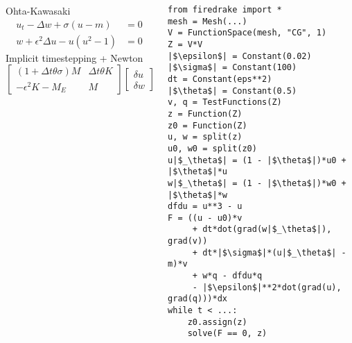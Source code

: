 \documentclass[presentation]{beamer}
\begin{document}
\begin{frame}[fragile]
  \begin{columns}
    \begin{column}{0.5\textwidth}
      \begin{block}{Ohta-Kawasaki}
        \small
        \begin{align*}
          u_t - \Delta w + \sigma(u - m) &= 0\\
          w + \epsilon^2 \Delta u - u(u^2 - 1) &= 0
        \end{align*}
        Implicit timestepping + Newton
        \begin{equation*}
          \begin{bmatrix}
            (1 + \Delta t \theta \sigma)M  & \Delta t\theta K \\
            -\epsilon^2 K - M_E & M
          \end{bmatrix}
          \begin{bmatrix}
            \delta u \\
            \delta w
          \end{bmatrix} =
          \begin{bmatrix}
            f_1 \\
            f_2
          \end{bmatrix}
        \end{equation*}
      \end{block}
    \end{column}
    \begin{column}{0.5\textwidth}
\begin{verbatim}
from firedrake import *
mesh = Mesh(...)
V = FunctionSpace(mesh, "CG", 1)
Z = V*V
|$\epsilon$| = Constant(0.02)
|$\sigma$| = Constant(100)
dt = Constant(eps**2)
|$\theta$| = Constant(0.5)
v, q = TestFunctions(Z)
z = Function(Z)
z0 = Function(Z)
u, w = split(z)
u0, w0 = split(z0)
u|$_\theta$| = (1 - |$\theta$|)*u0 + |$\theta$|*u
w|$_\theta$| = (1 - |$\theta$|)*w0 + |$\theta$|*w
dfdu = u**3 - u
F = ((u - u0)*v
     + dt*dot(grad(w|$_\theta$|), grad(v))
     + dt*|$\sigma$|*(u|$_\theta$| - m)*v
     + w*q - dfdu*q
     - |$\epsilon$|**2*dot(grad(u), grad(q)))*dx
while t < ...:
    z0.assign(z)
    solve(F == 0, z)
\end{verbatim}
    \end{column}
  \end{columns}
\end{frame}
\end{document}
